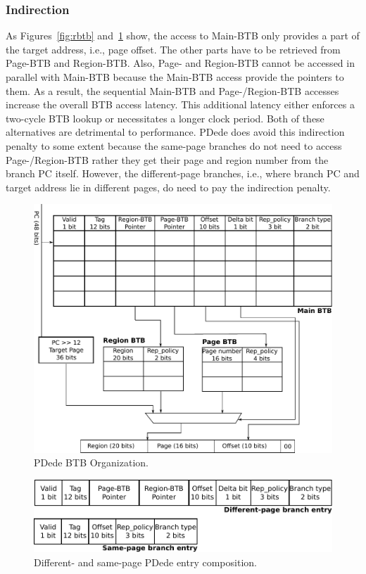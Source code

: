 \subsubsection{Indirection} As Figures~\ref{fig:rbtb} and~\ref{fig:pdede} show, the access to Main-BTB only provides a part of the target address, i.e., page offset. The other parts have to be retrieved from Page-BTB and Region-BTB. Also, Page- and Region-BTB cannot be accessed in parallel with Main-BTB because the Main-BTB access provide the pointers to them. As a result, the sequential Main-BTB and Page-/Region-BTB accesses increase the overall BTB access latency. This additional latency either enforces a two-cycle BTB lookup or necessitates a longer clock period. Both of these alternatives are detrimental to performance.  PDede does avoid this indirection penalty to some extent because the same-page branches do not need to access Page-/Region-BTB rather they get their page and region number from the branch PC itself. However, the different-page branches, i.e., where branch PC and target address lie in different pages, do need to pay the indirection penalty.

\begin{figure}
\centering
\includegraphics[width=.9\columnwidth, trim=0 0 0 10, clip]{figures/fig_9a.pdf}
\caption{PDede BTB Organization.}
\label{fig:pdede}
\end{figure}

\begin{figure}
\centering
\includegraphics[width=.9\columnwidth, trim=0 0 0 0, clip]{figures/PDede_branch_entries.pdf}
\caption{Different- and same-page PDede entry composition.}
\label{fig:pdedeEntry}
\end{figure}


